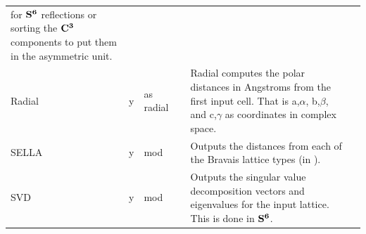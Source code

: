 \documentclass[preprint]{iucr}              %
\numberwithin{equation}{section}
\newcommand{\SVI}[0]{$\bf{S^{6}}$}
\newcommand{\CIII}[0]{$\bf{C^{3}}$}
\begin{document}
\begin{table}
\begin{tabular}{l l l p{} p{} l}
			for \SVI{}{ reflections or 
				sorting the \CIII{} components to put them 
				in the asymmetric unit.}	\\[.9pt]
			Radial&	y&	as radial	&&	
			Radial computes the polar distances in Angstroms 
			from the first input cell. 
			That is {a,$\alpha$}, {b,$\beta$}, and {c,$\gamma$} 
			as coordinates in complex space.\\[.9pt]
			SELLA&	y&	mod&&	
			Outputs the distances from each of the Bravais lattice types 
			(in \svi{}).	\\[.9pt]
			SVD&	y&	mod&& Outputs the singular value decomposition vectors
			and eigenvalues for the input lattice. This is done in \SVI{}.		\\[.9pt]			
			\bottomrule
			
		\end{tabular}
	\end{table}
	
\end{document}
